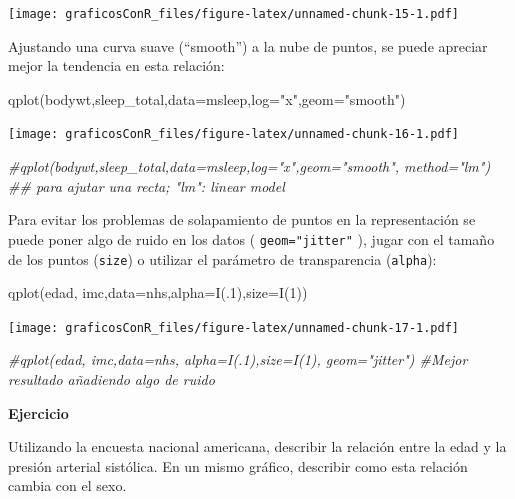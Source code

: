 \documentclass[
]{article}
\newenvironment{Shaded}{\begin{snugshade}}{\end{snugshade}}
\newcommand{\AttributeTok}[1]{\textcolor[rgb]{0.77,0.63,0.00}{#1}}
\newcommand{\CommentTok}[1]{\textcolor[rgb]{0.56,0.35,0.01}{\textit{#1}}}
\newcommand{\DecValTok}[1]{\textcolor[rgb]{0.00,0.00,0.81}{#1}}
\newcommand{\FunctionTok}[1]{\textcolor[rgb]{0.00,0.00,0.00}{#1}}
\newcommand{\NormalTok}[1]{#1}
\newcommand{\StringTok}[1]{\textcolor[rgb]{0.31,0.60,0.02}{#1}}
\newcounter{ejcnt}[section]
\numberwithin{ejcnt}{section}
\newenvironment{ej}[1][]{%
	\refstepcounter{ejcnt}%
	\par\medskip%
	\noindent%
	\textbf{Ejercicio \theejcnt \;\;}%
	\rmfamily%
}{\medskip}
\begin{document}
\texttt{[image: graficosConR\_files/figure-latex/unnamed-chunk-15-1.pdf]}

Ajustando una curva suave (``smooth'') a la nube de puntos, se puede apreciar mejor la tendencia en esta relación:

\begin{Shaded}
\begin{Highlighting}[]
\FunctionTok{qplot}\NormalTok{(bodywt,sleep\_total,}\AttributeTok{data=}\NormalTok{msleep,}\AttributeTok{log=}\StringTok{"x"}\NormalTok{,}\AttributeTok{geom=}\StringTok{"smooth"}\NormalTok{)}
\end{Highlighting}
\end{Shaded}

\texttt{[image: graficosConR\_files/figure-latex/unnamed-chunk-16-1.pdf]}

\begin{Shaded}
\begin{Highlighting}[]
\CommentTok{\#qplot(bodywt,sleep\_total,data=msleep,log="x",geom="smooth", method="lm") \#\# para ajutar una recta; "lm": linear model}
\end{Highlighting}
\end{Shaded}

Para evitar los problemas de solapamiento de puntos en la representación se puede poner algo de ruido en los datos ( \texttt{geom="jitter"} ), jugar con el tamaño de los puntos (\texttt{size}) o utilizar el parámetro de transparencia (\texttt{alpha}):

\begin{Shaded}
\begin{Highlighting}[]
\FunctionTok{qplot}\NormalTok{(edad, imc,}\AttributeTok{data=}\NormalTok{nhs,}\AttributeTok{alpha=}\FunctionTok{I}\NormalTok{(.}\DecValTok{1}\NormalTok{),}\AttributeTok{size=}\FunctionTok{I}\NormalTok{(}\DecValTok{1}\NormalTok{))}
\end{Highlighting}
\end{Shaded}

\texttt{[image: graficosConR\_files/figure-latex/unnamed-chunk-17-1.pdf]}

\begin{Shaded}
\begin{Highlighting}[]
\CommentTok{\#qplot(edad, imc,data=nhs, alpha=I(.1),size=I(1), geom="jitter") \#Mejor resultado añadiendo algo de ruido}
\end{Highlighting}
\end{Shaded}

\begin{ej}
Utilizando la encuesta nacional americana, describir la relación entre
la edad y la presión arterial sistólica. En un mismo gráfico, describir
como esta relación cambia con el sexo.
\end{ej}
\end{document}
